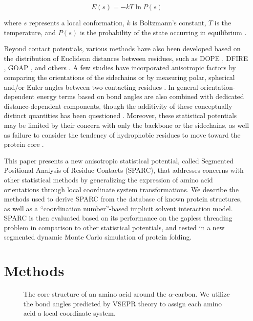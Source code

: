 \documentclass[11pt,titlepage]{article}
\begin{document}
\begin{equation}
E(s) = -kT\ln{P(s)}
\label{boltzmann_device}
\end{equation}

where $s$ represents a local conformation, $k$ is Boltzmann's constant, $T$ is the temperature, and $P(s)$ is the probability of the state occurring in equilibrium \cite{sippl}.

Beyond contact potentials, various methods have also been developed based on the distribution of Euclidean distances between residues, such as DOPE \cite{shen}, DFIRE \cite{zhou}, GOAP \cite{zhou2}, and others \cite{lu,zhang}.
A few studies have incorporated anisotropic factors by comparing the orientations of the sidechains \cite{zhang3,mukherjee} or by measuring polar, spherical and/or Euler angles between two contacting residues \cite{miyazawa2,buchete2003}. 
In general orientation-dependent energy terms based on bond angles are also combined with dedicated distance-dependent components, though the additivity of these conceptually distinct quantities has been questioned \cite{shen}.
Moreover, these statistical potentials may be limited by their concern with only the backbone or the sidechains, as well as failure to consider the tendency of hydrophobic residues to move toward the protein core \cite{mullinax}.

This paper presents a new anisotropic statistical potential, called Segmented Positional Analysis of Residue Contacts (SPARC), that addresses concerns with other statistical methods by generalizing the expression of amino acid orientations through local coordinate system transformations.
We describe the methods used to derive SPARC from the database of known protein structures, as well as a ``coordination number''-based implicit solvent interaction model.
SPARC is then evaluated based on its performance on the gapless threading problem in comparison to other statistical potentials, and tested in a new segmented dynamic Monte Carlo simulation of protein folding.

\section{Methods}

\begin{figure}
	\begin{center}
	\end{center}
	\caption{The core structure of an amino acid around the $\alpha$-carbon. We utilize the bond angles predicted by VSEPR theory to assign each amino acid a local coordinate system.}
	\label{aminoacid_axes}
\end{figure}
\end{document}
